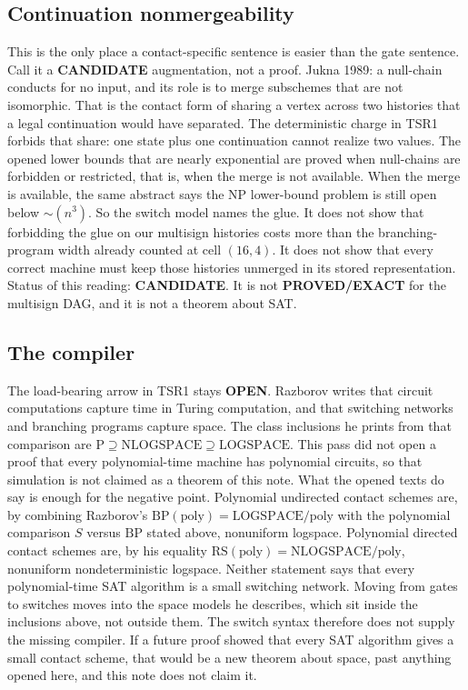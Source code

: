 \documentclass[11pt]{article}
\begin{document}
\subsection*{Continuation nonmergeability}
This is the only place a contact-specific sentence is easier than the gate sentence.
Call it a \textbf{CANDIDATE} augmentation, not a proof.
Jukna 1989: a null-chain conducts for no input, and its role is to merge subschemes that are not isomorphic.
That is the contact form of sharing a vertex across two histories that a legal continuation would have separated.
The deterministic charge in TSR1 forbids that share: one state plus one continuation cannot realize two values.
The opened lower bounds that are nearly exponential are proved when null-chains are forbidden or restricted, that is, when the merge is not available.
When the merge is available, the same abstract says the NP lower-bound problem is still open below \(\sim(n^3)\).
So the switch model names the glue.
It does not show that forbidding the glue on our multisign histories costs more than the branching-program width already counted at cell \((16,4)\).
It does not show that every correct machine must keep those histories unmerged in its stored representation.
Status of this reading: \textbf{CANDIDATE}.
It is not \textbf{PROVED/EXACT} for the multisign DAG, and it is not a theorem about SAT.

\subsection*{The compiler}
The load-bearing arrow in TSR1 stays \textbf{OPEN}.
Razborov writes that circuit computations capture time in Turing computation, and that switching networks and branching programs capture space.
The class inclusions he prints from that comparison are \(\mathrm{P}\supseteq\mathrm{NLOGSPACE}\supseteq\mathrm{LOGSPACE}\).
This pass did not open a proof that every polynomial-time machine has polynomial circuits, so that simulation is not claimed as a theorem of this note.
What the opened texts do say is enough for the negative point.
Polynomial undirected contact schemes are, by combining Razborov's \(\mathrm{BP}(\mathrm{poly})=\mathrm{LOGSPACE}/\mathrm{poly}\) with the polynomial comparison \(S\) versus \(\mathrm{BP}\) stated above, nonuniform logspace.
Polynomial directed contact schemes are, by his equality \(\mathrm{RS}(\mathrm{poly})=\mathrm{NLOGSPACE}/\mathrm{poly}\), nonuniform nondeterministic logspace.
Neither statement says that every polynomial-time SAT algorithm is a small switching network.
Moving from gates to switches moves into the space models he describes, which sit inside the inclusions above, not outside them.
The switch syntax therefore does not supply the missing compiler.
If a future proof showed that every SAT algorithm gives a small contact scheme, that would be a new theorem about space, past anything opened here, and this note does not claim it.
\end{document}
